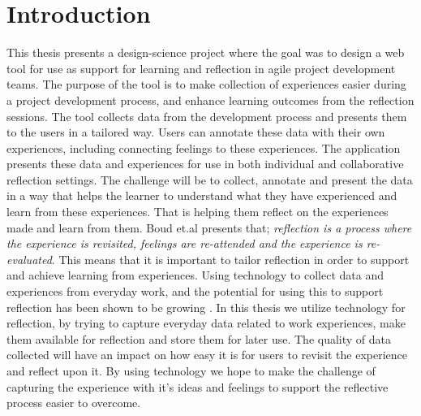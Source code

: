 \chapter{Introduction}
This thesis presents a design-science project where the goal was to design a web tool for use as support for learning and reflection in agile project development teams. The purpose of the tool is to make collection of experiences easier during a project development process, and enhance learning outcomes from the reflection sessions. The tool collects data from the development process and presents them to the users in a tailored way. Users can annotate these data with their own experiences, including connecting feelings to these experiences. The application presents these data and experiences for use in both individual and collaborative reflection settings. The challenge will be to collect, annotate and present the data in a way that helps the learner to understand what they have experienced and learn from these experiences. That is helping them reflect on the experiences made and learn from them. Boud et.al\citep{boudreflection1985} presents that; \emph{reflection is a process where the experience is revisited, feelings are re-attended and the experience is re-evaluated}. This means that it is important to tailor reflection in order to support and achieve learning from experiences. Using technology to collect data and experiences from everyday work, and the potential for using this to support reflection has been shown to be growing \citep{li2011understanding}. In this thesis we utilize technology for reflection, by trying to capture everyday data related to work experiences, make them available for reflection and store them for later use. The quality of data collected will have an impact on how easy it is for users to revisit the experience and reflect upon it. By using technology we hope to make the challenge of capturing the experience with it's ideas and feelings to support the reflective process easier to overcome. 

